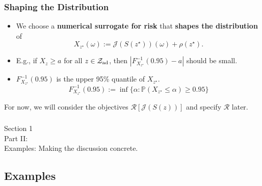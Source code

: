 \documentclass[aspectratio=169,xcolor=dvipsnames,10pt]{beamer}
\newcommand{\Zad}{\mathcal{Z}_{\text{\textup{ad}}}}
\newcommand{\risk}{\mathcal{R}}
\begin{document}
\begin{frame}\frametitle{Shaping the Distribution}
\begin{exampleblock}{}
\begin{itemize}
\item We choose a \textbf{numerical surrogate for risk} that \textbf{shapes the distribution} of
\[
X_{z^{\star}}(\omega) := \mathcal{J}(S(z^{\star}))(\omega) + \rho(z^{\star}).
\] 
\item E.g., if $X_{z} \ge a$ for all $z \in \Zad$, then  $|F_{X_{z^{\star}}}^{-1}(0.95)-a|$ should be small.
\item $F_{X_{z^{\star}}}^{-1}(0.95)$ is the upper 95\% quantile of $X_{z^{\star}}$.
\[
F_{X_{z^{\star}}}^{-1}(0.95) := \inf \{ \alpha : \mathbb P(X_{z^{\star}} \le \alpha ) \ge 0.95 \}
\]
\end{itemize}
\end{exampleblock}
\begin{exampleblock}{}
\centering
For now, we will consider the objectives $\risk[\mathcal{J}(S(z))]$ and specify $\risk$ later.
\end{exampleblock}
\end{frame}

\begin{frame}\frametitle{}
\begin{center}\Large
Section 1\\
Part II:\\
Examples: Making the discussion concrete.
\end{center}
\end{frame}

\subsection{Examples}
\end{document}
